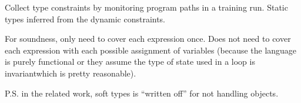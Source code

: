 \documentclass{article}
\begin{document}

Collect type constraints by monitoring program paths in a training run.
Static types inferred from the dynamic constraints.

For soundness, only need to cover each expression once.
Does not need to cover each expression with each possible assignment of variables
 (because the language is purely functional or they assume the type of state used in a loop is invariant\textemdash which is pretty reasonable).

P.S. in the related work, soft types is ``written off'' for not handling objects.


\footnotesize


\end{document}
